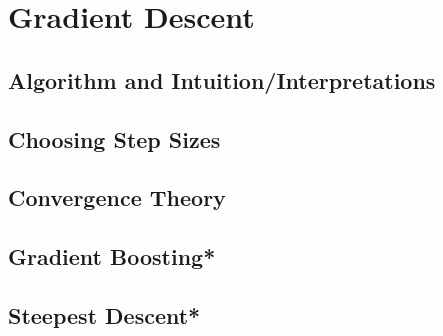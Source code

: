 \chapter{Gradient Descent}
\label{chap:gradient_descent}

\section{Algorithm and Intuition/Interpretations}

\section{Choosing Step Sizes}

\section{Convergence Theory}

\section{Gradient Boosting*}

\section{Steepest Descent*}